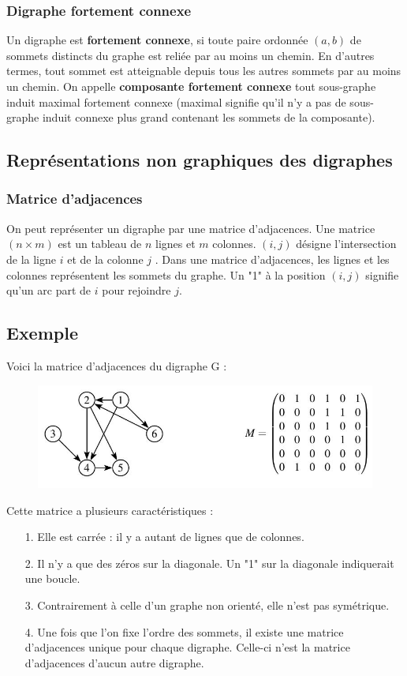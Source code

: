 \subsubsection*{Digraphe fortement connexe}
Un digraphe est \textbf{fortement connexe}, si toute paire ordonnée $ (a, b) $ de sommets distincts du
graphe est reliée par au moins un chemin. En d'autres termes, tout sommet est atteignable
depuis tous les autres sommets par au moins un chemin.
On appelle \textbf{composante fortement connexe} tout sous-graphe induit maximal fortement
connexe (maximal signifie qu'il n'y a pas de sous-graphe induit connexe plus grand contenant les sommets de la composante).


\subsection{Représentations non graphiques des digraphes}
\subsubsection{ Matrice d'adjacences}
On peut représenter un digraphe par une matrice d'adjacences. Une matrice $ (n\times m) $ est
un tableau de $ n $ lignes et $ m $ colonnes. $ (i, j) $ désigne l'intersection de la ligne $ i $ et de la
colonne $ j $ .
Dans une matrice d'adjacences, les lignes et les colonnes représentent les sommets du
graphe. Un "1" à la position $ (i, j ) $ signifie qu'un arc part de $ i $ pour rejoindre $ j $.
\subsection*{Exemple}
Voici la matrice d'adjacences du digraphe G :
\begin{figure}[h]
\centering
\includegraphics[width=0.7\linewidth]{images/graph23}
\end{figure}

Cette matrice a plusieurs caractéristiques :
\begin{itemize}
	\item[1.] Elle est carrée : il y a autant de lignes que de colonnes.
\item[2.] Il n'y a que des zéros sur la diagonale. Un "1" sur la diagonale indiquerait une
boucle.
\item[3.] Contrairement à celle d'un graphe non orienté, elle n'est pas symétrique.
\item[4.] Une fois que l'on fixe l'ordre des sommets, il existe une matrice d'adjacences unique
pour chaque digraphe. Celle-ci n'est la matrice d'adjacences d'aucun autre digraphe.
\end{itemize}


